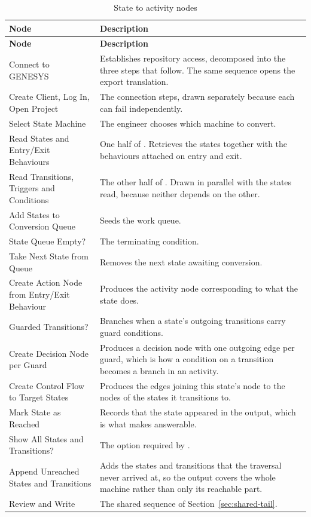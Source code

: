 \begin{longtable}{L{0.30\textwidth}L{0.62\textwidth}}
	\caption{State to activity nodes}\label{tab:sa-nodes}\\
	\toprule
	\textbf{Node} & \textbf{Description} \\
	\midrule
	\endfirsthead
	\toprule
	\textbf{Node} & \textbf{Description} \\
	\midrule
	\endhead

	Connect to GENESYS & Establishes repository access, decomposed into the three
	steps that follow. The same sequence opens the export translation. \\
	\addlinespace
	Create Client, Log In, Open Project & The connection steps, drawn separately
	because each can fail independently. \\
	\addlinespace
	Select State Machine & The engineer chooses which machine to convert. \\
	\addlinespace
	Read States and Entry/Exit Behaviours & One half of . Retrieves the
	states together with the behaviours attached on entry and exit. \\
	\addlinespace
	Read Transitions, Triggers and Conditions & The other half of .
	Drawn in parallel with the states read, because neither depends on the
	other. \\
	\addlinespace
	Add States to Conversion Queue & Seeds the work queue. \\
	\addlinespace
	State Queue Empty? & The terminating condition. \\
	\addlinespace
	Take Next State from Queue & Removes the next state awaiting conversion. \\
	\addlinespace
	Create Action Node from Entry/Exit Behaviour & Produces the activity node
	corresponding to what the state does. \\
	\addlinespace
	Guarded Transitions? & Branches when a state's outgoing transitions carry
	guard conditions. \\
	\addlinespace
	Create Decision Node per Guard & Produces a decision node with one outgoing
	edge per guard, which is how a condition on a transition becomes a branch in an
	activity. \\
	\addlinespace
	Create Control Flow to Target States & Produces the edges joining this state's
	node to the nodes of the states it transitions to. \\
	\addlinespace
	Mark State as Reached & Records that the state appeared in the output, which
	is what makes  answerable. \\
	\addlinespace
	Show All States and Transitions? & The option required by . \\
	\addlinespace
	Append Unreached States and Transitions & Adds the states and transitions that
	the traversal never arrived at, so the output covers the whole machine rather
	than only its reachable part. \\
	\addlinespace
	Review and Write & The shared sequence of
	Section~\ref{sec:shared-tail}. \\
	\bottomrule
\end{longtable}

